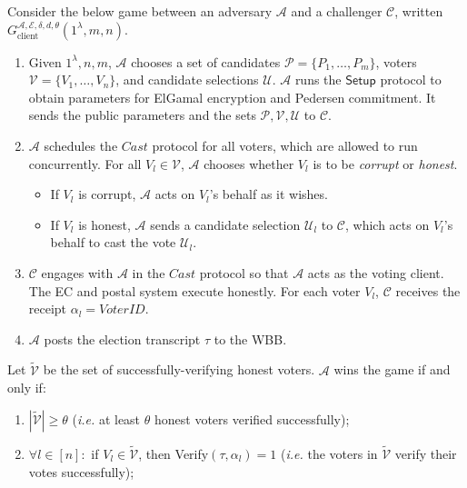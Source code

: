 \documentclass[12pt,a4paper]{article}
\theoremstyle{definition}
\newcommand{\VoterID}{\mathit{VoterID}}
\newcommand{\ie}{\textit{i.e. }}
\begin{document}
\begin{definition}
    Consider the below game between an adversary $\mathcal{A}$ and a challenger $\mathcal{C}$, written $G_\text{client}^{\mathcal{A},\mathcal{E},\delta,d,\theta}(1^\lambda, m, n)$.
    \begin{enumerate}
        \item Given $1^\lambda, n, m$, $\mathcal{A}$ chooses a set of candidates $\mathcal{P}=\{P_1,\ldots,P_m\}$, voters $\mathcal{V}=\{V_1,\ldots,V_n\}$, and candidate selections $\mathcal{U}$. $\mathcal{A}$ runs the $\mathsf{Setup}$ protocol to obtain parameters for ElGamal encryption and Pedersen commitment. It sends the public parameters and the sets $\mathcal{P}, \mathcal{V}, \mathcal{U}$ to $\mathcal{C}$.
        
        \item $\mathcal{A}$ schedules the $\mathit{Cast}$ protocol for all voters, which are allowed to run concurrently. For all $V_l\in\mathcal{V}$, $\mathcal{A}$ chooses whether $V_l$ is to be \textit{corrupt} or \textit{honest}.
        \begin{itemize}
            \item If $V_l$ is corrupt, $\mathcal{A}$ acts on $V_l$'s behalf as it wishes.
            \item If $V_l$ is honest, $\mathcal{A}$ sends a candidate selection $\mathcal{U}_l$ to $\mathcal{C}$, which acts on $V_l$'s behalf to cast the vote $\mathcal{U}_l$.
        \end{itemize}

        \item $\mathcal{C}$ engages with $\mathcal{A}$ in the $\mathit{Cast}$ protocol so that $\mathcal{A}$ acts as the voting client. The EC and postal system execute honestly. For each voter $V_l$, $\mathcal{C}$ receives the receipt $\alpha_l=\VoterID$.

        \item $\mathcal{A}$ posts the election transcript $\tau$ to the WBB.
    \end{enumerate}
    Let $\tilde{\mathcal{V}}$ be the set of successfully-verifying honest voters. $\mathcal{A}$ wins the game if and only if:
    \begin{enumerate}
        \item $|\tilde{\mathcal{V}}| \geq \theta$ (\ie at least $\theta$ honest voters verified successfully);
        \item $\forall l \in [n]:$ if $V_l \in \tilde{\mathcal{V}}$, then Verify$(\tau, \alpha_l) 	=1$ (\ie the voters in $\tilde{\mathcal{V}}$ verify their votes successfully);
    

\end{enumerate}
\end{definition}
\end{document}
